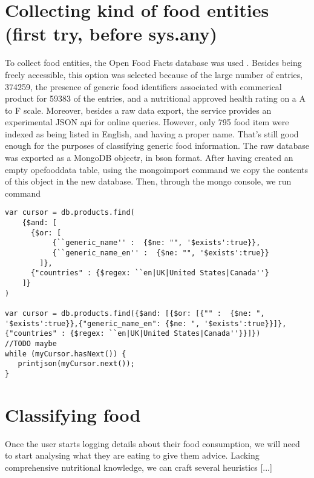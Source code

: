 \documentclass{article}
\begin{document}
\section{Collecting kind of food entities (first try, before sys.any)}
To collect food entities, the Open Food Facts database was used \cite{openfoodfacts}. Besides being freely accessible, this option was selected because of the large number of entries, 374259, the presence of generic food identifiers associated with commerical product for 59383 of the entries, and a nutritional approved health rating on a A to F scale. Moreover, besides a raw data export, the service provides an experimental JSON api for online queries. However, only 795 food item were indexed as being listed in English, and having a proper name. That's still good enough for the purposes of classifying generic food information.
The raw database was exported as a MongoDB \cite{mongo} objectr, in bson format. After having created an empty opefooddata table, using the mongoimport command we copy the contents of this object in the new database. Then, through the mongo console, we run command
\begin{lstlisting}
var cursor = db.products.find( 
    {$and: [
      {$or: [
           {``generic_name'' :  {$ne: "", '$exists':true}},
           {``generic_name_en'' :  {$ne: "", '$exists':true}}
        ]},
      {"countries" : {$regex: ``en|UK|United States|Canada''}
    ]}
)

var cursor = db.products.find({$and: [{$or: [{"" :  {$ne: ", '$exists':true}},{"generic_name_en": {$ne: ", '$exists':true}}]}, {"countries" : {$regex: ``en|UK|United States|Canada''}}]})
//TODO maybe 
while (myCursor.hasNext()) {
   printjson(myCursor.next());
}
\end{lstlisting}


\section{Classifying food}
Once the user starts logging details about their food consumption, we will need to start analysing what they are eating to give them advice. Lacking comprehensive nutritional knowledge, we can craft several heuristics [...]
\end{document}
